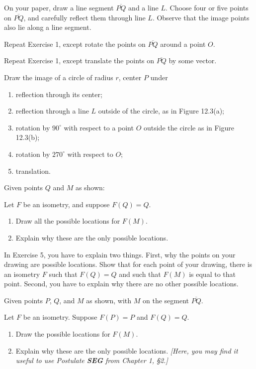 \documentclass[12pt]{book} %
\begin{document}
\begin{ExerciseList}
\setcounter{Exercise}{0}
\begin{ExerciseList}
\Exercise On your paper, draw a line segment $\overline{PQ}$ and a line $L$. Choose four or five points on $\overline{PQ}$, and carefully reflect them through line $L$. Observe that the image points also lie along a line segment.

\Exercise Repeat Exercise 1, except rotate the points on $\overline{PQ}$ around a point $O$.

\Exercise Repeat Exercise 1, except translate the points on $\overline{PQ}$ by some vector.

\Exercise Draw the image of a circle of radius $r$, center $P$ under
\begin{enumerate}
\item[(a)] reflection through its center;
\item[(b)] reflection through a line $L$ outside of the circle, as in Figure 12.3(a);
\item[(c)] rotation by $90^\circ$ with respect to a point $O$ outside the circle as in Figure 12.3(b);
\item[(d)] rotation by $270^\circ$ with respect to $O$;
\item[(e)] translation.
\end{enumerate}


\Exercise Given points $Q$ and $M$ as shown:


Let $F$ be an isometry, and suppose $F(Q)=Q$.
\begin{enumerate}
\item[(a)] Draw all the possible locations for $F(M)$.
\item[(b)] Explain why these are the only possible locations.
\end{enumerate}

In Exercise 5, you have to explain two things. First, why the points on your drawing are possible locations. Show that for each point of your drawing, there is an isometry $F$ such that $F(Q)=Q$ and such that $F(M)$ is equal to that point. Second, you have to explain why there are no other possible locations.

\Exercise Given points $P$, $Q$, and $M$ as shown, with $M$ on the segment $\overline{PQ}$.


Let $F$ be an isometry. Suppose $F(P)=P$ and $F(Q)=Q$.
\begin{enumerate}
\item[(a)] Draw the possible locations for $F(M)$.
\item[(b)] Explain why these are the only possible locations. \textit{[Here, you may find it useful to use Postulate \textbf{SEG} from Chapter 1, \S2.]}
\end{enumerate}


\end{ExerciseList}
\end{ExerciseList}
\end{document}
